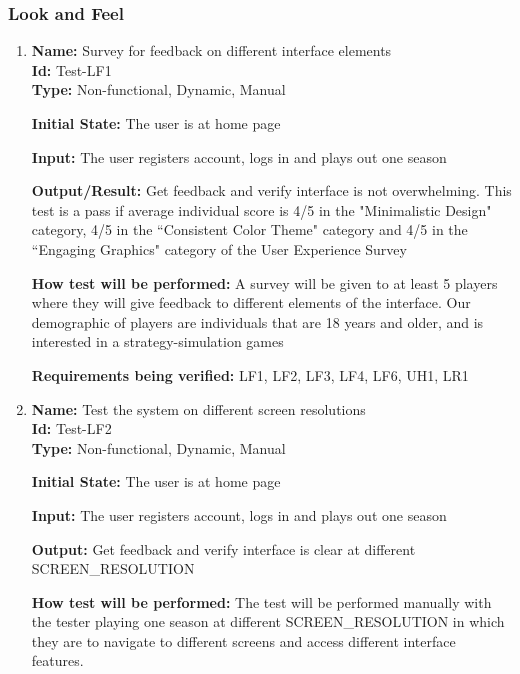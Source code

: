 \documentclass[12pt, titlepage]{article}
\begin{document}
\subsubsection{Look and Feel}

\begin{enumerate}

\item{\textbf{Name:} Survey for feedback on different interface elements\\} \label{Test-LF1}%
\textbf{Id:} Test-LF1\\

\textbf{Type:} Non-functional, Dynamic, Manual
					
\textbf{Initial State: }The user is at home page
					
\textbf{Input:} The user registers account, logs in and plays out one season
					
\textbf{Output/Result:} Get feedback and verify interface is not overwhelming. This test is a pass if average individual score is 4/5 in the "Minimalistic Design" category, 4/5 in the ``Consistent Color Theme" category and 4/5 in the ``Engaging Graphics" category of the User Experience Survey
					
\textbf{How test will be performed:} A survey will be given to at least 5 players where they will give feedback to different elements of the interface. Our demographic of players are individuals that are 18 years and older, and is interested in a strategy-simulation games  
					
\textbf{Requirements being verified:} LF1, LF2, LF3, LF4, LF6, UH1, LR1
					
\item{\textbf{Name: }Test the system on different screen resolutions \\}\label{Test-LF2}
\textbf{Id: }Test-LF2\\

\textbf{Type: }Non-functional, Dynamic, Manual
					
\textbf{Initial State:} The user is at home page
					
\textbf{Input:} The user registers account, logs in and plays out one season
					
\textbf{Output:} Get feedback and verify interface is clear at different SCREEN\_RESOLUTION %
					
\textbf{How test will be performed:} The test will be performed manually with the tester playing one season at different SCREEN\_RESOLUTION in which they are to navigate to different screens and access different interface features.


\end{enumerate}
\end{document}
